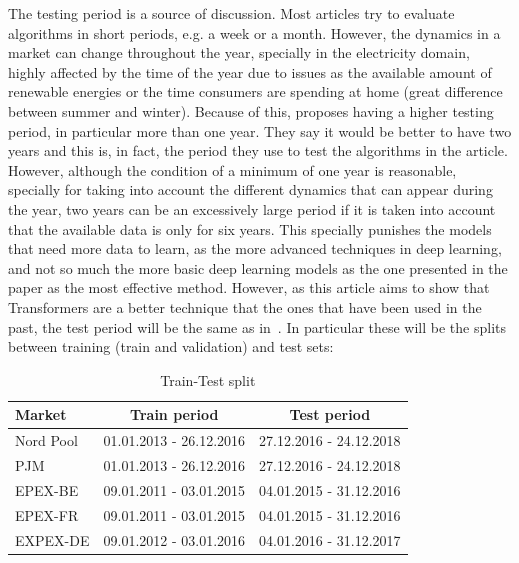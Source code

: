 \documentclass[journal]{IEEEtran}
\begin{document}
The testing period is a source of discussion. Most articles try to evaluate algorithms in short periods, e.g. a week or a month. However, the dynamics in a market can change throughout the year, specially in the electricity domain, highly affected by the time of the year due to issues as the available amount of renewable energies or the time consumers are spending at home (great difference between summer and winter). Because of this, \cite{lagoForecastingDayaheadElectricity2021} proposes having a higher testing period, in particular more than one year. They say it would be better to have two years and this is, in fact, the period they use to test the algorithms in the article. However, although the condition of a minimum of one year is reasonable, specially for taking into account the different dynamics that can appear during the year, two years can be an excessively large period if it is taken into account that the available data is only for six years. This specially punishes the models that need more data to learn, as the more advanced techniques in deep learning, and not so much the more basic deep learning models as the one presented in the paper as the most effective method. However, as this article aims to show that Transformers are a better technique that the ones that have been used in the past, the test period will be the same as in~\cite{lagoForecastingDayaheadElectricity2021}. In particular these will be the splits between training (train and validation) and test sets:

\begin{table}[h!]
    \begin{center}
        \begin{tabular}{| l | c | c |}
            \textbf{Market} & \textbf{Train period} & \textbf{Test period} \\ \hline
            Nord Pool & 01.01.2013 - 26.12.2016 & 27.12.2016 - 24.12.2018 \\
            PJM & 01.01.2013 - 26.12.2016 & 27.12.2016 - 24.12.2018 \\
            EPEX-BE & 09.01.2011 - 03.01.2015 & 04.01.2015 - 31.12.2016 \\
            EPEX-FR & 09.01.2011 - 03.01.2015 & 04.01.2015 - 31.12.2016 \\ 
            EXPEX-DE & 09.01.2012 - 03.01.2016 & 04.01.2016 - 31.12.2017
        \end{tabular}
        \caption{Train-Test split}
        \label{tab: train-test split}
    \end{center}
\end{table}
\end{document}
